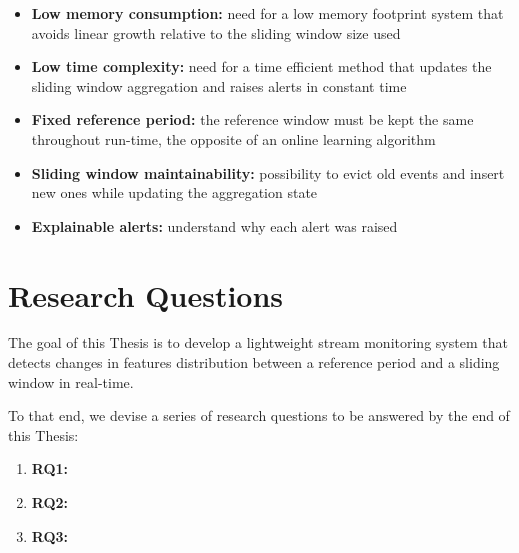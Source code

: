 \begin{itemize}
    \item \textbf{Low memory consumption:} need for a low memory footprint system that avoids linear growth relative to the sliding window size used
    
    \item \textbf{Low time complexity:} need for a time efficient method that updates the sliding window aggregation and raises alerts in constant time
    
    \item \textbf{Fixed reference period:} the reference window must be kept the same throughout run-time, the opposite of an online learning algorithm
    
    \item \textbf{Sliding window maintainability:} possibility to evict old events and insert new ones while updating the aggregation state
    
    \item \textbf{Explainable alerts:} understand why each alert was raised
\end{itemize}


\section{Research Questions}
The goal of this Thesis is to develop a lightweight stream monitoring system that detects changes in features distribution between a reference period and a sliding window in real-time.

To that end, we devise a series of research questions to be answered by the end of this Thesis:

\begin{enumerate}
    \item \textbf{RQ1:}
    \item \textbf{RQ2:}
    \item \textbf{RQ3:}
\end{enumerate}